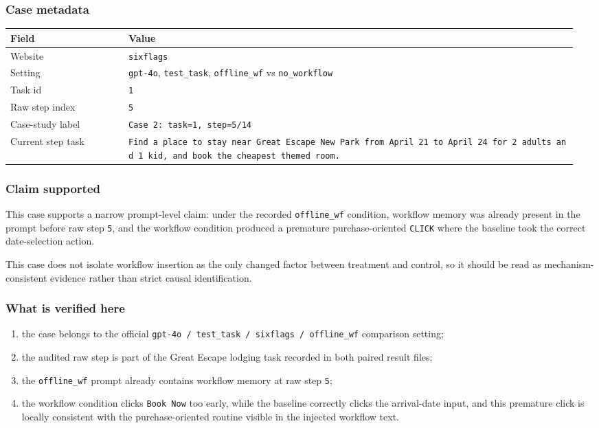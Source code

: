 \subsubsection{Case metadata}

{\def\LTcaptype{} %
\begin{longtable}[]{@{}>{\raggedright\arraybackslash}p{0.20\linewidth}>{\raggedright\arraybackslash}p{0.76\linewidth}@{}}
\toprule\noalign{}
Field & Value \\
\midrule\noalign{}
\endhead
\bottomrule\noalign{}
\endlastfoot
Website & \texttt{sixflags} \\
Setting & \texttt{gpt-4o}, \texttt{test\_task}, \texttt{offline\_wf} vs
\texttt{no\_workflow} \\
Task id & \texttt{1} \\
Raw step index & \texttt{5} \\
Case-study label & \texttt{Case\ 2:\ task=1,\ step=5/14} \\
Current step task &
\texttt{Find\ a\ place\ to\ stay\ near\ Great\ Escape\ New\ Park\ from\ April\ 21\ to\ April\ 24\ for\ 2\ adults\ and\ 1\ kid,\ and\ book\ the\ cheapest\ themed\ room.} \\
\end{longtable}
}

\subsubsection{Claim supported}

This case supports a narrow prompt-level claim: under the recorded
\texttt{offline\_wf} condition, workflow memory was already present in
the prompt before raw step \texttt{5}, and the workflow condition
produced a premature purchase-oriented \texttt{CLICK} where the
baseline took the correct date-selection action.

This case does not isolate workflow insertion as the only changed factor
between treatment and control, so it should be read as
mechanism-consistent evidence rather than strict causal identification.

\subsubsection{What is verified here}

\begin{enumerate}
\def\labelenumi{\arabic{enumi}.}
\tightlist
\item the case belongs to the official \texttt{gpt-4o / test\_task / sixflags / offline\_wf} comparison setting;
\item the audited raw step is part of the Great Escape lodging task recorded in both paired result files;
\item the \texttt{offline\_wf} prompt already contains workflow memory at raw step \texttt{5};
\item the workflow condition clicks \texttt{Book Now} too early, while the baseline correctly clicks the arrival-date input, and this premature click is locally consistent with the purchase-oriented routine visible in the injected workflow text.
\end{enumerate}

